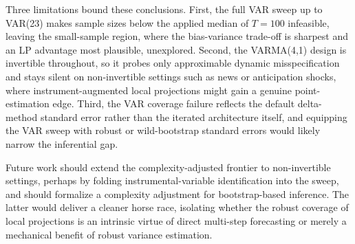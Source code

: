 Three limitations bound these conclusions. First, the full VAR sweep up to VAR(23) makes sample
sizes below the applied median of $T = 100$ infeasible, leaving the small-sample region, where the
bias-variance trade-off is sharpest and an LP advantage most plausible, unexplored. Second, the
VARMA(4,1) design is invertible throughout, so it probes only approximable dynamic
misspecification and stays silent on non-invertible settings such as news or anticipation shocks,
where instrument-augmented local projections might gain a genuine point-estimation edge. Third,
the VAR coverage failure reflects the default delta-method standard error rather than the iterated
architecture itself, and equipping the VAR sweep with robust or wild-bootstrap standard errors
would likely narrow the inferential gap.

Future work should extend the complexity-adjusted frontier to non-invertible settings, perhaps by
folding instrumental-variable identification into the sweep, and should formalize a complexity
adjustment for bootstrap-based inference. The latter would deliver a cleaner horse race, isolating
whether the robust coverage of local projections is an intrinsic virtue of direct multi-step
forecasting or merely a mechanical benefit of robust variance estimation.